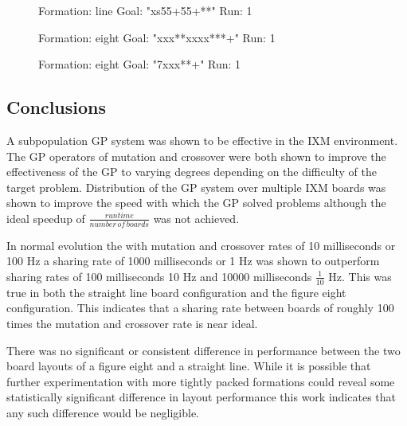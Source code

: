 \documentclass[11pt]{article}
\begin{document}
\begin{itemize}
  \begin{figure}
  \centering
  \caption{Formation: line Goal: "xs55+55+**" Run: 1}
  \end{figure}


  \begin{figure}
  \centering
  \caption{Formation: eight Goal: "xxx**xxxx***+" Run: 1}
  \end{figure}


  \begin{figure}
  \centering
  \caption{Formation: eight Goal: "7xxx**+" Run: 1}
  \end{figure}


\end{itemize} %
\subsection*{Conclusions}
\label{sec-1.6}

A subpopulation GP system was shown to be effective in the IXM
environment.  The GP operators of mutation and crossover were both
shown to improve the effectiveness of the GP to varying degrees
depending on the difficulty of the target problem.  Distribution of
the GP system over multiple IXM boards was shown to improve the speed
with which the GP solved problems although the ideal speedup of
$\frac{runtime}{number\,of\,boards}$ was not achieved.

In normal evolution the with mutation and crossover rates of 10
milliseconds or 100 Hz a sharing rate of 1000 milliseconds or 1 Hz was
shown to outperform sharing rates of 100 milliseconds 10 Hz and 10000
milliseconds $\frac{1}{10}$ Hz.  This was true in both the straight
line board configuration and the figure eight configuration.  This
indicates that a sharing rate between boards of roughly 100 times the
mutation and crossover rate is near ideal.

There was no significant or consistent difference in performance
between the two board layouts of a figure eight and a straight line.
While it is possible that further experimentation with more tightly
packed formations could reveal some statistically significant
difference in layout performance this work indicates that any such
difference would be negligible.
\end{document}
